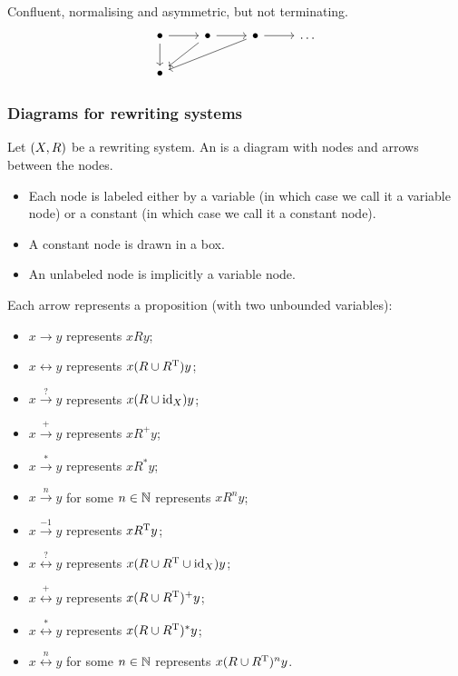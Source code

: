 \begin{example}
Confluent, normalising and asymmetric, but not terminating.
\[ \begin{tikzcd}
\bullet \rar \dar & \bullet \rar \ar[dl] & \bullet \rar \ar[dll] & \hdots \\
\bullet
\end{tikzcd} \]
\end{example}


\subsubsection{Diagrams for rewriting systems}
\begin{definition}
Let $\sSet{X,R}$ be a rewriting system. An  is a diagram with nodes and arrows between the nodes.
\begin{itemize}
\item Each node is labeled either by a variable (in which case we call it a variable node) or a constant (in which case we call it a constant node).
\item A constant node is drawn in a box.
\item An unlabeled node is implicitly a variable node.
\end{itemize}
Each arrow represents a proposition (with two unbounded variables):
\begin{itemize}
\item $x\to y$ represents $xRy$;
\item $x\leftrightarrow y$ represents $x(R\cup R^{\mathrm{T}})y$;
\item $x\overset{?}{\to}y$ represents $x(R\cup \operatorname{id}_X)y$;
\item $x\overset{+}{\to}y$ represents $xR^+y$;
\item $x\overset{*}{\to}y$ represents $xR^*y$;
\item $x\overset{n}{\to}y$ for some $n\in \mathbb{N}$ represents $xR^ny$;
\item $x\overset{-1}{\to}y$ represents $xR^{\mathrm{T}} y$;
\item $x\overset{?}{\leftrightarrow}y$ represents $x(R\cup R^{\mathrm{T}} \cup \operatorname{id}_X)y$;
\item $x\overset{+}{\leftrightarrow}y$ represents $x(R\cup R^{\mathrm{T}})^+y$;
\item $x\overset{*}{\leftrightarrow}y$ represents $x(R\cup R^{\mathrm{T}})^*y$;
\item $x\overset{n}{\leftrightarrow}y$ for some $n\in \mathbb{N}$ represents $x(R\cup R^{\mathrm{T}})^ny$.
\end{itemize}

\end{definition}
